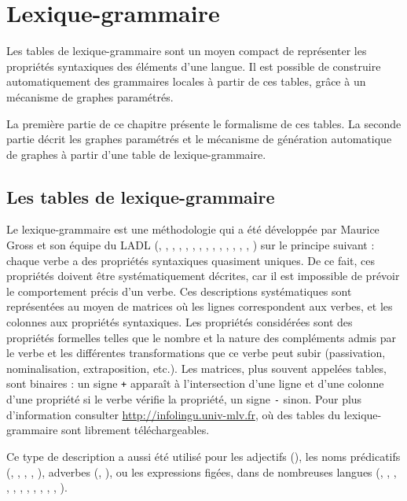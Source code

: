 \chapter{Lexique-grammaire}
\label{chap-lexicon-grammar}
Les tables de lexique-grammaire sont un moyen compact de représenter les propriétés
syntaxiques des éléments d’une langue. Il est possible de construire automatiquement des
grammaires locales à partir de ces tables, grâce à un mécanisme de graphes paramétrés.


\bigskip
\noindent La première partie de ce chapitre présente le formalisme de ces tables. La seconde partie
décrit les graphes paramétrés et le mécanisme de génération automatique de graphes à partir d’une
table de lexique-grammaire.



\section{Les tables de lexique-grammaire}
Le lexique-grammaire est une méthodologie qui a été développée par Maurice Gross et
son équipe du LADL (\cite{L}, \cite{BGL}, \cite{methodes-en-syntaxe}, \cite{GL},
\cite{gross1994}, \cite{gross1994b}, \cite{gross1991}, \cite{gross1986}, 
\cite{gross1984}, \cite{gross1984b}, \cite{gross1983}, \cite{gross1982}, 
\cite{gross1978}, \cite{leclere2005}, \cite{salkoff2004})
sur le principe suivant : chaque verbe a des propriétés syntaxiques quasiment uniques.
De ce fait, ces propriétés doivent être systématiquement décrites, car il est impossible de prévoir
le comportement précis d’un verbe. Ces descriptions systématiques sont représentées au moyen de
matrices où les lignes correspondent aux verbes, et les colonnes aux propriétés syntaxiques. Les
propriétés considérées sont des propriétés formelles telles que le nombre et la nature des
compléments admis par le verbe et les différentes transformations que ce verbe peut subir
(passivation, nominalisation, extraposition, etc.).
Les matrices, plus souvent appelées tables, sont binaires : un signe  \verb$+$ apparaît à
l’intersection d’une ligne et d’une colonne d’une propriété si le verbe vérifie la propriété,
un signe \verb+-+ sinon. Pour plus d'information consulter
\url{http://infolingu.univ-mlv.fr}, où des tables du lexique-grammaire sont librement
téléchargeables.

\bigskip
\noindent Ce type de description a aussi été utilisé pour les adjectifs 
(\cite{these-annie}), les noms prédicatifs (\cite{les-nominalisations},
\cite{les-predicats-nominaux}, \cite{giry1978}, \cite{gross1976},
\cite{ranchhod2001}), adverbes (\cite{syntaxe-de-ladverbe},
\cite{grammaire-des-adverbes}), ou les expressions figées, dans de nombreuses langues
(\cite{lexique-grammaire-allemand2}, \cite{lexique-grammaire-italien2},
\cite{lexique-grammaire-italien}, \cite{lexique-grammaire-coreen2},
\cite{lexique-grammaire-coreen}, \cite{lexique-grammaire-malgache},
\cite{lexique-grammaire-espagnol}, \cite{lexique-grammaire-allemand},
\cite{lexique-grammaire-hongrois}, \cite{ranchhod1996}, \cite{ranchhod1991},
\cite{gross1986b}).

